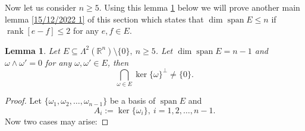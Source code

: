 \documentclass[11pt, a4paper, reqno]{amsart}
\numberwithin{equation}{section}
\newcommand{\spann}{\operatorname{span}}
\newcommand{\rank}{\operatorname{rank}}
\newtheorem{lemma}[theorem]{Lemma}
\begin{document}
Now let us consider $n\geq 5.$ Using this lemma \ref{25/2/2022 00} below we will prove another main lemma \ref{15/12/2022 1} of this section which states that $\dim \spann E\leq n$ if $\rank [e-f]\leq 2$ for any $e,f\in E.$
\begin{lemma}\label{25/2/2022 00}
 Let $E\subseteq \Lambda^2(\mathbb R^n)\setminus\{0\}, \ n\geq 5$. Let $\dim \spann E=n-1$ and $\omega \wedge \omega'=0$ for any $\omega,\omega'\in E$, then 
 $$\displaystyle\bigcap_{\omega \in E}\ker \{\omega\}^{\perp}\neq \{0\}.$$
\end{lemma}
\begin{proof}
Let $\{\omega_1,\omega_2,\ldots, \omega_{n-1}\}$ be a basis of $\spann E$ and $$A_i:=\ker\{\omega_i\},\ i=1,2,\ldots, n-1.$$
Now two cases may arise:


\end{proof}
\end{document}
